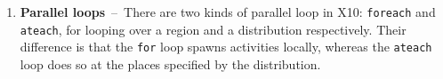 \begin{enumerate}


\item{\bf Parallel loops}~--~There are two kinds of parallel loop in X10: {\tt foreach} and {\tt ateach}, for looping over a region and a distribution respectively. Their difference is that the {\tt for} loop spawns activities locally, whereas the {\tt ateach} loop does so at the places specified by the distribution. 



\end{enumerate}
